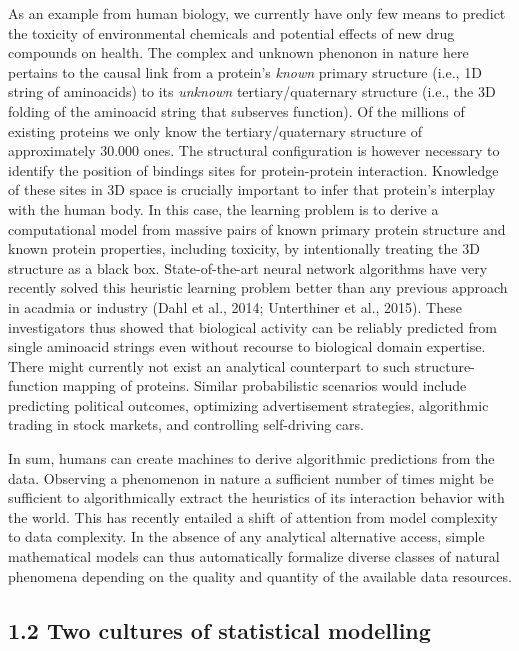 \documentclass[authoryear,review,3p]{elsarticle}
\begin{document}
As an example from human biology,
we currently have only few means to predict the
toxicity of environmental chemicals and
potential effects of new drug compounds on health.
%
The complex and unknown phenonon in nature here pertains
to the causal link from
a protein's \textit{known} primary structure
(i.e., 1D string of aminoacids)
to
its \textit{unknown} tertiary/quaternary structure
(i.e., the 3D folding of the aminoacid string that subserves function).
%
Of the millions of existing proteins
we only know the tertiary/quaternary structure of
approximately 30.000 ones.
The structural configuration is however necessary to identify the position of
bindings sites for protein-protein interaction.
Knowledge of these sites in 3D space is crucially important
to infer that protein's interplay with the human body.
%
In this case,
the learning problem is to
derive a computational model from
massive pairs of known primary protein structure and
known protein properties, including toxicity,
by intentionally treating the 3D structure
as a black box.
%
State-of-the-art neural network algorithms
have very recently solved this heuristic learning problem
better than any previous approach in acadmia or industry
(Dahl et al., 2014; Unterthiner et al., 2015).
These investigators thus showed that biological activity
can be reliably predicted from single aminoacid strings
even without recourse to biological domain expertise.
%
There might currently not exist
an analytical counterpart to such
structure-function mapping of proteins.
%
%
Similar probabilistic scenarios would include predicting
political outcomes,
optimizing advertisement strategies,
algorithmic trading in stock markets, and
controlling self-driving cars.


In sum,
humans can create machines to derive
algorithmic predictions from the data.
Observing a phenomenon in nature a sufficient number of times
might be sufficient to
algorithmically extract
the heuristics of its interaction behavior with the world.
This has recently entailed a shift
of attention from model complexity to data complexity.
In the absence of any analytical alternative access,
simple mathematical models can thus automatically
formalize diverse classes of natural phenomena
depending on the quality and quantity of
the available data resources.



\subsection*{1.2 Two cultures of statistical modelling}
\end{document}
